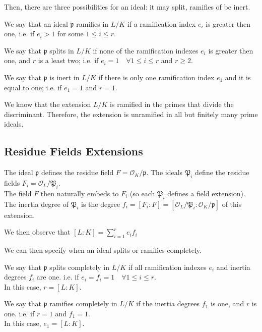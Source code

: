 Then, there are three possibilities for an ideal: it may split, ramifies of be inert.
\begin{definition}
    We say that an ideal $\mathfrak{p}$ ramifies in $L/K$ if a ramification index $e_i$ is greater then one, 
    i.e. if $e_i>1$ for some $1 \leq i \leq r$.
\end{definition}
\begin{definition}
    We say that $\mathfrak{p}$ splits in $L/K$ if none of the ramification indexes $e_i$ is greater then one, and $r$ is a least two; 
    i.e. if $e_i=1 \quad \forall 1 \leq i \leq r$ and $r \geq 2$.
\end{definition}
\begin{definition}
    We say that $\mathfrak{p}$ is inert in $L/K$ if there is only one ramification index $e_1$ and it is equal to one;
    i.e. if $e_1=1$ and $r=1$.
\end{definition}
We know that the extension $L/K$ is ramified in the primes that divide the discriminant. Therefore, the extension is unramified in all but finitely many prime ideals.


\subsection{Residue Fields Extensions}
The ideal $\mathfrak{p}$ defines the residue field $F=\mathcal{O}_K/\mathfrak{p}$.
The ideals $\mathfrak{P}_i$ define the residue fields $F_i=\mathcal{O}_L/\mathfrak{P}_i$.\\
The field $F$ then naturally embeds to $F_i$ (so each $\mathfrak{P}_i$ defines a field extension).
The inertia degree of $\mathfrak{P}_i$ is the degree $f_i=[F_i:F]=[\mathcal{O}_L/\mathfrak{P}_i:\mathcal{O}_K/\mathfrak{p}]$ of this extension.

We then observe that $[L:K] = \sum_{i=1}^r e_if_i$

We can then specify when an ideal splits or ramifies completely.
\begin{definition}
    We say that $\mathfrak{p}$ splits completely in $L/K$ if all ramification indexes $e_i$ and inertia degrees $f_i$ are one.
    i.e. if $e_i=f_i=1 \quad \forall 1 \leq i \leq r$.\\
    In this case, $r=[L:K]$.
\end{definition}
\begin{definition}
    We say that $\mathfrak{p}$ ramifies completely in $L/K$ if the inertia degrees $f_1$ is one, and $r$ is one.
    i.e. if $r=1$ and $f_1=1$.\\
    In this case, $e_1=[L:K]$.
\end{definition}

